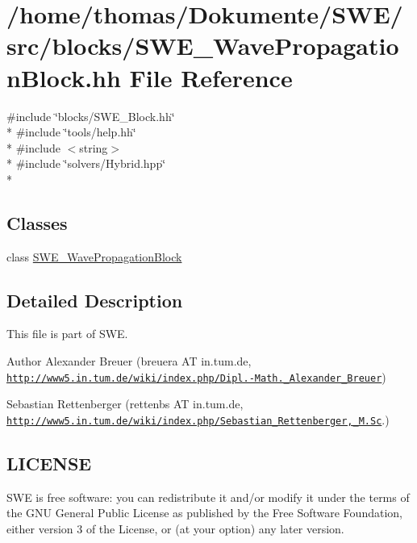 \hypertarget{SWE__WavePropagationBlock_8hh}{\section{/home/thomas/\-Dokumente/\-S\-W\-E/src/blocks/\-S\-W\-E\-\_\-\-Wave\-Propagation\-Block.hh File Reference}
\label{SWE__WavePropagationBlock_8hh}
}
{\ttfamily \#include \char`\"{}blocks/\-S\-W\-E\-\_\-\-Block.\-hh\char`\"{}}\\*
{\ttfamily \#include \char`\"{}tools/help.\-hh\char`\"{}}\\*
{\ttfamily \#include $<$string$>$}\\*
{\ttfamily \#include \char`\"{}solvers/\-Hybrid.\-hpp\char`\"{}}\\*
\subsection*{Classes}
\begin{DoxyCompactItemize}
\item 
class \hyperlink{classSWE__WavePropagationBlock}{S\-W\-E\-\_\-\-Wave\-Propagation\-Block}
\end{DoxyCompactItemize}


\subsection{Detailed Description}
This file is part of S\-W\-E.

\begin{DoxyAuthor}{Author}
Alexander Breuer (breuera A\-T in.\-tum.\-de, \href{http://www5.in.tum.de/wiki/index.php/Dipl.-Math._Alexander_Breuer}{\tt http\-://www5.\-in.\-tum.\-de/wiki/index.\-php/\-Dipl.-\/\-Math.\-\_\-\-Alexander\-\_\-\-Breuer}) 

Sebastian Rettenberger (rettenbs A\-T in.\-tum.\-de, \href{http://www5.in.tum.de/wiki/index.php/Sebastian_Rettenberger,_M.Sc}{\tt http\-://www5.\-in.\-tum.\-de/wiki/index.\-php/\-Sebastian\-\_\-\-Rettenberger,\-\_\-\-M.\-Sc}.)
\end{DoxyAuthor}
\hypertarget{Writer_8hh_LICENSE}{}\subsection{L\-I\-C\-E\-N\-S\-E}\label{Writer_8hh_LICENSE}
S\-W\-E is free software\-: you can redistribute it and/or modify it under the terms of the G\-N\-U General Public License as published by the Free Software Foundation, either version 3 of the License, or (at your option) any later version.

